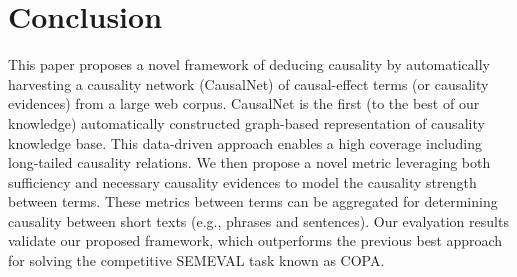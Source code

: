 \section{Conclusion}
\label{sec:conclude} 
This paper proposes a novel framework of
deducing causality by automatically harvesting a 
causality network (CausalNet) of causal-effect terms (or causality evidences)
from a large web corpus. 
CausalNet is the first (to the best of our
knowledge) automatically constructed graph-based
representation of causality knowledge base.
This data-driven approach enables
a high coverage including long-tailed causality
relations. 
We then propose a novel metric leveraging both sufficiency and
necessary causality evidences
to model the causality strength 
between terms. 
These metrics between terms can be aggregated for
determining causality
between short texts (e.g., phrases and sentences).
Our evalyation results validate our proposed framework, which outperforms
the previous best approach for solving the competitive SEMEVAL task
known as COPA.

%
